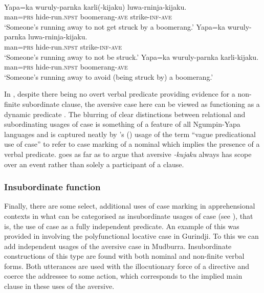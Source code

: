 \documentclass[output=paper,colorlinks,citecolor=brown]{langscibook}
\begin{document}
\ea\label{ex:bro27} 
 {\citealt[2]{laughren_expressing_2015}} \\
\ea\label{ex:bro27a}
\gll Yapa=ka wuruly-parnka karli(-kijaku) luwa-rninja-kijaku. \\
man=\textsc{prs} hide-run.\textsc{npst} boomerang-\textsc{ave} strike-\textsc{inf-ave} \\
\glt `Someone's running away to not get struck by a boomerang.'
\ex\label{ex:bro27b}
\gll Yapa=ka wuruly-parnka luwa-rninja-kijaku. \\
man=\textsc{prs} hide-run.\textsc{npst} strike-\textsc{inf-ave} \\
\glt `Someone's running away to not be struck.'
\ex\label{ex:bro27c} 
\gll Yapa=ka wuruly-parnka karli-kijaku. \\
man=\textsc{prs} hide-run.\textsc{npst} boomerang-\textsc{ave} \\
\glt `Someone's running away to avoid (being struck by) a boomerang.'
\z 
\z

\noindent In , despite there being no overt verbal predicate providing evidence for a non-finite subordinate clause, the aversive case here can be viewed as functioning as a dynamic predicate \citep{laughren_expressing_2015}. The blurring of clear distinctions between relational and subordinating usages of case is something of a feature of all Ngumpin-Yapa languages and is captured neatly by \citeauthor{hale_essential_1982}'s (\citeyear[285]{hale_essential_1982}) usage of the term ``vague predicational use of case'' to refer to case marking of a nominal which implies the presence of a verbal predicate. \citet{laughren_expressing_2015} goes as far as to argue that aversive \textit{-kujaku} always has scope over an event rather than solely a participant of a clause.


\subsubsection{Insubordinate function}
\label{subsubsec:insubordinate}

Finally, there are some select, additional uses of case marking in apprehensional contexts in what can be categorised as insubordinate usages of case (see \cite{evans_insubordination_2007,evans_insubordination_2016}), that is, the use of case as a fully independent predicate. An example of this was provided in  involving the polyfunctional locative case in Gurindji. To this we can add independent usages of the aversive case in Mudburra. Insubordinate constructions of this type are found with both nominal  and non-finite verbal  forms. Both utterances are used with the illocutionary force of a directive and coerce the addressee to some action, which corresponds to the implied main clause in these uses of the aversive.
\end{document}
